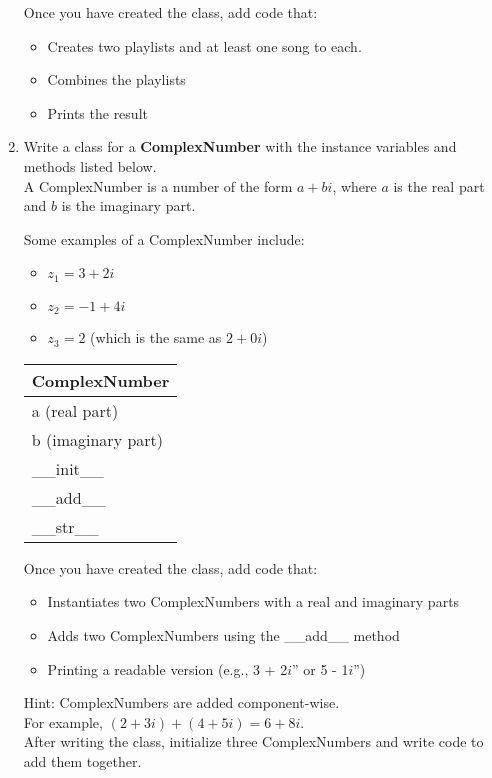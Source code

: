 \documentclass{article}
\newcommand{\csq}[1]{\reflectbox{''}#1''}  %
\begin{document}
\begin{enumerate}
		Once you have created the class, add code that:
		\begin{itemize}
			\item Creates two playlists and at least one song to each.
			\item Combines the playlists
			\item Prints the result
		\end{itemize}



	\item
		Write a class for a \textbf{ComplexNumber} with the instance variables and methods listed 
		below.\\
		A ComplexNumber is a number of the form $a + bi$, where $a$ is the real part and $b$ is 
		the imaginary part.
			
		\begin{minipage}[t]{0.7\textwidth}
			Some examples of a ComplexNumber include:
			\begin{itemize}
				\item $z_1 = 3 + 2i$
				\item $z_2 = -1 + 4i$
				\item $z_3 = 2$ (which is the same as $2 + 0i$)
			\end{itemize}

		\end{minipage}
		\hfill
		\begin{minipage}[t]{0.25\textwidth}
			\vspace{.2em}
			\begin{flushright}
				\begin{tabular}{|l|}
					\hline
					ComplexNumber \\ \hline
					a (real part) \\
					b (imaginary part) \\ \hline
					\_\_init\_\_ \\
					\_\_add\_\_ \\
					\_\_str\_\_ \\ \hline
				\end{tabular}
			\end{flushright}
		\end{minipage}
		
		Once you have created the class, add code that:
		\begin{itemize}
			\item Instantiates two ComplexNumbers with a real and imaginary parts
			\item Adds two ComplexNumbers using the \_\_add\_\_ method
			\item Printing a readable version (e.g., \csq{3 + 2$i$} or \csq{5 - 1$i$})
		\end{itemize}
		
		Hint: ComplexNumbers are added component-wise.\\
		For example, $(2 + 3i) + (4 + 5i) = 6 + 8i$.\\
		
		After writing the class, initialize three ComplexNumbers and write code to add them 
		together.



\end{enumerate}
\end{document}
